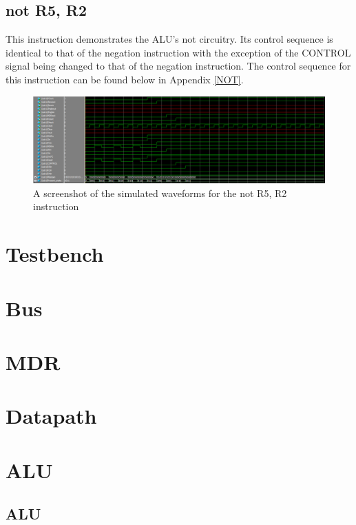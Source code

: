 \documentclass{article}
\begin{document}
    \subsection{not R5, R2}
    This instruction demonstrates the ALU's not circuitry. Its control sequence is identical to that of the negation instruction with the exception of the CONTROL signal being changed to that of the negation instruction. The control sequence for this instruction can be found below in Appendix \ref{NOT}.
    \begin{figure}[h!]
        \begin{center}
            \includegraphics[width=15cm]{not}
            \caption{A screenshot of the simulated waveforms for the not R5, R2 instruction}
        \end{center}
    \end{figure}

\appendix
\section{Testbench} \label{Testbench}
    
\section{Bus} \label{Bus}
    
\section{MDR}\label{MDR}
    
\section{Datapath} \label{Datapath}
    
\section{ALU} \label{ALU}
    \subsection{ALU}
        
\end{document}
